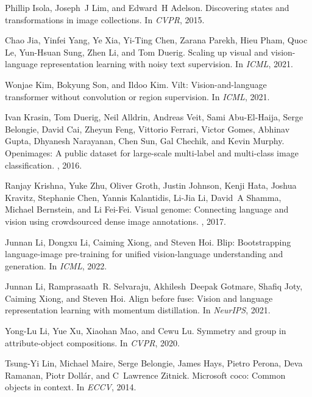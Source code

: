 \documentclass[10pt,twocolumn,letterpaper]{article}
\begin{document}
\begin{thebibliography}{10}
Phillip Isola, Joseph~J Lim, and Edward~H Adelson.
\newblock Discovering states and transformations in image collections.
\newblock In {\em CVPR}, 2015.

Chao Jia, Yinfei Yang, Ye Xia, Yi-Ting Chen, Zarana Parekh, Hieu Pham, Quoc Le,
  Yun-Hsuan Sung, Zhen Li, and Tom Duerig.
\newblock Scaling up visual and vision-language representation learning with
  noisy text supervision.
\newblock In {\em ICML}, 2021.

Wonjae Kim, Bokyung Son, and Ildoo Kim.
\newblock Vilt: Vision-and-language transformer without convolution or region
  supervision.
\newblock In {\em ICML}, 2021.

Ivan Krasin, Tom Duerig, Neil Alldrin, Andreas Veit, Sami Abu-El-Haija, Serge
  Belongie, David Cai, Zheyun Feng, Vittorio Ferrari, Victor Gomes, Abhinav
  Gupta, Dhyanesh Narayanan, Chen Sun, Gal Chechik, and Kevin Murphy.
\newblock Openimages: A public dataset for large-scale multi-label and
  multi-class image classification.
, 2016.

Ranjay Krishna, Yuke Zhu, Oliver Groth, Justin Johnson, Kenji Hata, Joshua
  Kravitz, Stephanie Chen, Yannis Kalantidis, Li-Jia Li, David~A Shamma,
  Michael Bernstein, and Li Fei-Fei.
\newblock Visual genome: Connecting language and vision using crowdsourced
  dense image annotations.
, 2017.

Junnan Li, Dongxu Li, Caiming Xiong, and Steven Hoi.
\newblock Blip: Bootstrapping language-image pre-training for unified
  vision-language understanding and generation.
\newblock In {\em ICML}, 2022.

Junnan Li, Ramprasaath~R. Selvaraju, Akhilesh~Deepak Gotmare, Shafiq Joty,
  Caiming Xiong, and Steven Hoi.
\newblock Align before fuse: Vision and language representation learning with
  momentum distillation.
\newblock In {\em NeurIPS}, 2021.

Yong-Lu Li, Yue Xu, Xiaohan Mao, and Cewu Lu.
\newblock Symmetry and group in attribute-object compositions.
\newblock In {\em CVPR}, 2020.

Tsung-Yi Lin, Michael Maire, Serge Belongie, James Hays, Pietro Perona, Deva
  Ramanan, Piotr Doll{\'a}r, and C~Lawrence Zitnick.
\newblock Microsoft coco: Common objects in context.
\newblock In {\em ECCV}, 2014.


\end{thebibliography}
\end{document}
